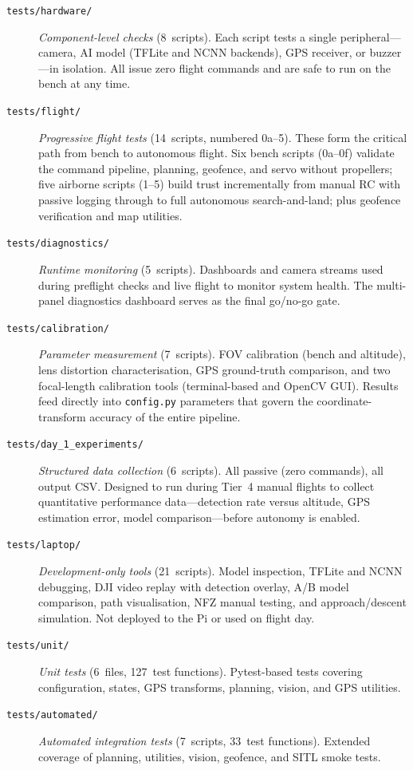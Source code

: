 \begin{description}
    \item[\texttt{tests/hardware/}] \emph{Component-level checks} (8~scripts).  Each script tests a single peripheral---camera, AI model (TFLite and NCNN backends), GPS receiver, or buzzer---in isolation.  All issue zero flight commands and are safe to run on the bench at any time.
    \item[\texttt{tests/flight/}] \emph{Progressive flight tests} (14~scripts, numbered 0a--5).  These form the critical path from bench to autonomous flight.  Six bench scripts (0a--0f) validate the command pipeline, planning, geofence, and servo without propellers; five airborne scripts (1--5) build trust incrementally from manual RC with passive logging through to full autonomous search-and-land; plus geofence verification and map utilities.
    \item[\texttt{tests/diagnostics/}] \emph{Runtime monitoring} (5~scripts).  Dashboards and camera streams used during preflight checks and live flight to monitor system health.  The multi-panel diagnostics dashboard serves as the final go/no-go gate.
    \item[\texttt{tests/calibration/}] \emph{Parameter measurement} (7~scripts).  FOV calibration (bench and altitude), lens distortion characterisation, GPS ground-truth comparison, and two focal-length calibration tools (terminal-based and OpenCV GUI).  Results feed directly into \texttt{config.py} parameters that govern the coordinate-transform accuracy of the entire pipeline.
    \item[\texttt{tests/day\_1\_experiments/}] \emph{Structured data collection} (6~scripts).  All passive (zero commands), all output CSV.  Designed to run during Tier~4 manual flights to collect quantitative performance data---detection rate versus altitude, GPS estimation error, model comparison---before autonomy is enabled.
    \item[\texttt{tests/laptop/}] \emph{Development-only tools} (21~scripts).  Model inspection, TFLite and NCNN debugging, DJI video replay with detection overlay, A/B model comparison, path visualisation, NFZ manual testing, and approach/descent simulation.  Not deployed to the Pi or used on flight day.
    \item[\texttt{tests/unit/}] \emph{Unit tests} (6~files, 127~test functions).  Pytest-based tests covering configuration, states, GPS transforms, planning, vision, and GPS utilities.
    \item[\texttt{tests/automated/}] \emph{Automated integration tests} (7~scripts, 33~test functions).  Extended coverage of planning, utilities, vision, geofence, and SITL smoke tests.
\end{description}

